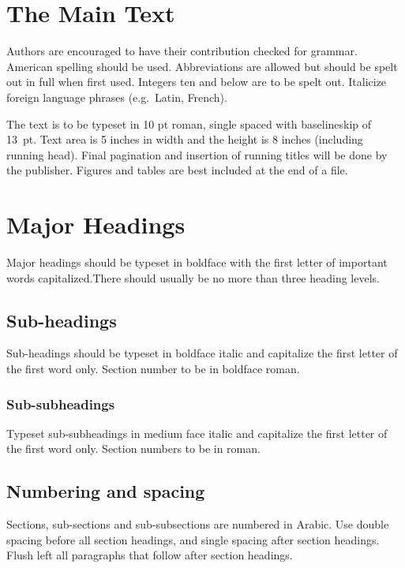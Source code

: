 \documentclass{IJCS_template}
\begin{document}



\section{The Main Text}
Authors are encouraged to have their contribution checked for grammar.
American spelling should be used. Abbreviations are allowed but should
be spelt out in full when first used. Integers ten and below are to be
spelt out. Italicize foreign language phrases (e.g.~Latin, French).

The text is to be typeset in 10 pt roman, single spaced with
baselineskip of 13~pt. Text area is 5 inches in width and the height
is 8 inches (including running head).  Final pagination and
insertion of running titles will be done by the publisher. Figures
and tables are best included at the end of a file.

\section{Major Headings}
Major headings should be typeset in boldface with the first letter
of important words capitalized.There should usually be no more than
three heading levels.

\subsection{Sub-headings}
Sub-headings should be typeset in boldface italic and capitalize the
first letter of the first word only. Section number to be in boldface
roman.

\subsubsection{Sub-subheadings}
Typeset sub-subheadings in medium face italic and capitalize the first
letter of the first word only. Section numbers to be in roman.

\subsection{Numbering and spacing}
Sections, sub-sections and sub-subsections are numbered in Arabic.
Use double spacing before all section headings, and single spacing
after section headings. Flush left all paragraphs that follow after
section headings.
\end{document}
